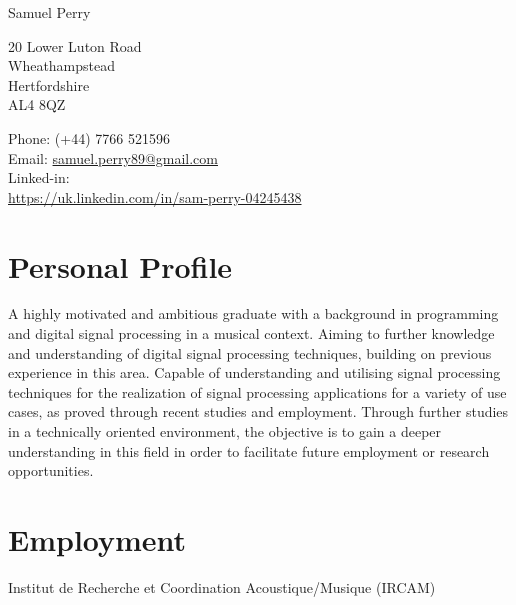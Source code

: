 \documentclass[10pt,letterpaper]{article}
\def\name{Samuel Perry}
\renewenvironment{itemize}{
  \begin{list}{}{
    \setlength{\leftmargin}{1.5em}
    \setlength{\itemsep}{0.25em}
    \setlength{\parskip}{0pt}
    \setlength{\parsep}{0.25em}
  }
}{
  \end{list}
}
\begin{document}
{\huge \name}


\bigskip

\begin{minipage}[t]{0.495\textwidth}
  20 Lower Luton Road\\
  Wheathampstead\\
  Hertfordshire\\
  AL4 8QZ\\

\end{minipage}
\begin{minipage}[t]{0.495\textwidth}
    Phone: (+44) 7766 521596\\
    Email: \href{mailto:samuel.perry89@gmail.com}{samuel.perry89@gmail.com} \\
    Linked-in: \\\href{https://uk.linkedin.com/in/sam-perry-04245438}{https://uk.linkedin.com/in/sam-perry-04245438}
\end{minipage}

\section*{Personal Profile}

A highly motivated and ambitious graduate with a background in programming and
digital signal processing in a musical context. Aiming to further knowledge and
understanding of digital signal processing techniques, building on previous
experience in this area. Capable of understanding and utilising signal
processing techniques for the realization of signal processing applications for
a variety of use cases, as proved through recent studies and employment.
Through further studies in a technically oriented environment,  the objective
is to gain a deeper understanding in this field in order to facilitate future
employment or research opportunities.

\section*{Employment}

\begin{itemize}
    \item Institut de Recherche et Coordination Acoustique/Musique (IRCAM)
\end{itemize}
\end{document}
